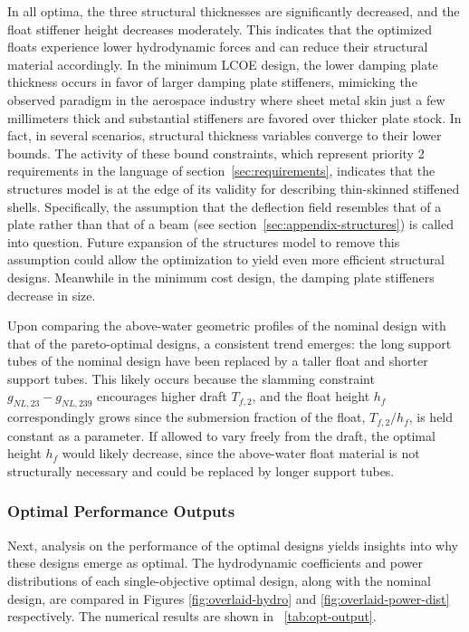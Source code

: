 In all optima, the three structural thicknesses are significantly decreased, and the float stiffener height decreases moderately.
This indicates that the optimized floats experience lower hydrodynamic forces and can reduce their structural material accordingly.
In the minimum LCOE design, the lower damping plate thickness occurs in favor of larger damping plate stiffeners, mimicking the observed paradigm in the aerospace industry where sheet metal skin just a few millimeters thick and substantial stiffeners are favored over thicker plate stock.
In fact, in several scenarios, structural thickness variables converge to their lower bounds.
The activity of these bound constraints, which represent priority 2 requirements in the language of section~\ref{sec:requirements}, indicates that the structures model is at the edge of its validity for describing thin-skinned stiffened shells.
Specifically, the assumption that the deflection field resembles that of a plate rather than that of a beam (see section~\ref{sec:appendix-structures}) is called into question.
Future expansion of the structures model to remove this assumption could allow the optimization to yield even more efficient structural designs.
Meanwhile in the minimum cost design, the damping plate stiffeners decrease in size. 


Upon comparing the above-water geometric profiles of the nominal design with that of the pareto-optimal designs, a consistent trend emerges: the long support tubes of the nominal design have been replaced by a taller float and shorter support tubes.
This likely occurs because the slamming constraint $g_{NL,23}-g_{NL,239}$ encourages higher draft $T_{f,2}$, and the float height $h_f$ correspondingly grows since the submersion fraction of the float, $T_{f,2}/h_f$, is held constant as a parameter.
If allowed to vary freely from the draft, the optimal height $h_f$ would likely decrease, since the above-water float material is not structurally necessary and could be replaced by longer support tubes.

\subsubsection{Optimal Performance Outputs}
Next, analysis on the performance of the optimal designs yields insights into why these designs emerge as optimal.
The hydrodynamic coefficients and power distributions of each single-objective optimal design, along with the nominal design, are compared in Figures \ref{fig:overlaid-hydro} and \ref{fig:overlaid-power-dist} respectively.
The numerical results are shown in \tablename~\ref{tab:opt-output}.


